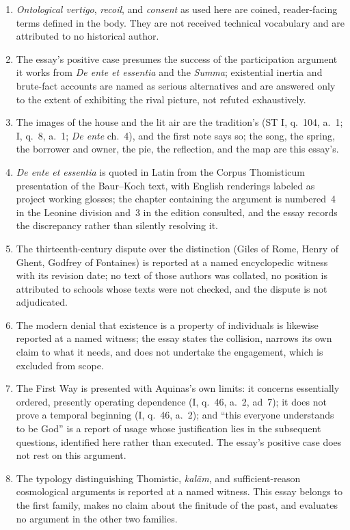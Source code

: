\begin{enumerate}[leftmargin=1.45em,itemsep=0.25em]
\item \emph{Ontological vertigo}, \emph{recoil}, and \emph{consent} as used here are coined, reader-facing terms defined in the body. They are not received technical vocabulary and are attributed to no historical author.
\item The essay's positive case presumes the success of the participation argument it works from \emph{De ente et essentia} and the \emph{Summa}; existential inertia and brute-fact accounts are named as serious alternatives and are answered only to the extent of exhibiting the rival picture, not refuted exhaustively.
\item The images of the house and the lit air are the tradition's (ST I, q.~104, a.~1; I, q.~8, a.~1; \emph{De ente} ch.~4), and the first note says so; the song, the spring, the borrower and owner, the pie, the reflection, and the map are this essay's.
\item \emph{De ente et essentia} is quoted in Latin from the Corpus Thomisticum presentation of the Baur--Koch text, with English renderings labeled as project working glosses; the chapter containing the argument is numbered~4 in the Leonine division and~3 in the edition consulted, and the essay records the discrepancy rather than silently resolving it.
\item The thirteenth-century dispute over the distinction (Giles of Rome, Henry of Ghent, Godfrey of Fontaines) is reported at a named encyclopedic witness with its revision date; no text of those authors was collated, no position is attributed to schools whose texts were not checked, and the dispute is not adjudicated.
\item The modern denial that existence is a property of individuals is likewise reported at a named witness; the essay states the collision, narrows its own claim to what it needs, and does not undertake the engagement, which is excluded from scope.
\item The First Way is presented with Aquinas's own limits: it concerns essentially ordered, presently operating dependence (I, q.~46, a.~2, ad~7); it does not prove a temporal beginning (I, q.~46, a.~2); and ``this everyone understands to be God'' is a report of usage whose justification lies in the subsequent questions, identified here rather than executed. The essay's positive case does not rest on this argument.
\item The typology distinguishing Thomistic, \emph{kal\=am}, and sufficient-reason cosmological arguments is reported at a named witness. This essay belongs to the first family, makes no claim about the finitude of the past, and evaluates no argument in the other two families.

\end{enumerate}
